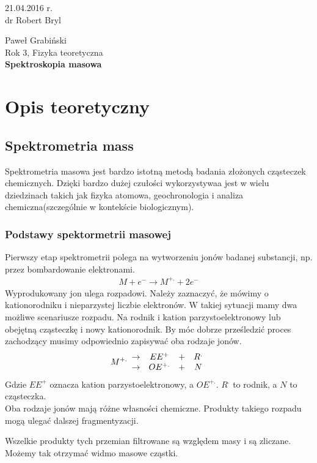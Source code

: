 \documentclass[paper=a4, fontsize=12pt]{scrartcl}
\begin{document}
\begin{flushright}
21.04.2016 r.\\
dr Robert Bryl
\end{flushright}Paweł Grabiński\\
Rok 3, Fizyka teoretyczna\\[0.5cm]
{\huge \bf Spektroskopia masowa}
\section{Opis teoretyczny}
\subsection{Spektrometria mass}
Spektrometria masowa jest bardzo istotną metodą badania złożonych cząsteczek chemicznych. Dzięki bardzo dużej czułości wykorzystywaa jest w wielu dziedzinach takich jak fizyka atomowa, geochronologia i analiza chemiczna(szczególnie w kontekście biologicznym).
\subsubsection{Podstawy spektormetrii masowej}
Pierwszy etap spektrometrii polega na wytworzeniu jonów badanej substancji, np. przez bombardowanie elektronami.
\begin{align*}
M+e^-\rightarrow M^{+.}+2e^-
\end{align*}
Wyprodukowany jon ulega rozpadowi. Należy zaznaczyć, że mówimy o kationorodniku i nieparzystej liczbie elektronów. W takiej sytuacji mamy dwa możliwe scenariusze rozpadu. Na rodnik i kation parzystoelektronowy lub obejętną cząsteczkę i nowy kationorodnik. By móc dobrze prześledzić proces zachodzący musimy odpowiednio zapisywać oba rodzaje jonów.
\begin{align*}
M^{+.}\begin{array}{c c c c}
 \rightarrow& EE^+& + & R^. \\
 \rightarrow& OE^{+.}& + & N
\end{array}
\end{align*}
Gdzie $EE^+$ oznacza kation parzystoelektronowy, a $OE^{+.}$. $R^.$ to rodnik, a $N$ to cząsteczka.\\

Oba rodzaje jonów mają różne własności chemiczne. Produkty takiego rozpadu mogą ulegać dalszej fragmentyzacji.

Wszelkie produkty tych przemian filtrowane są względem masy i są zliczane. Możemy tak otrzymać widmo masowe cząstki.
\end{document}
